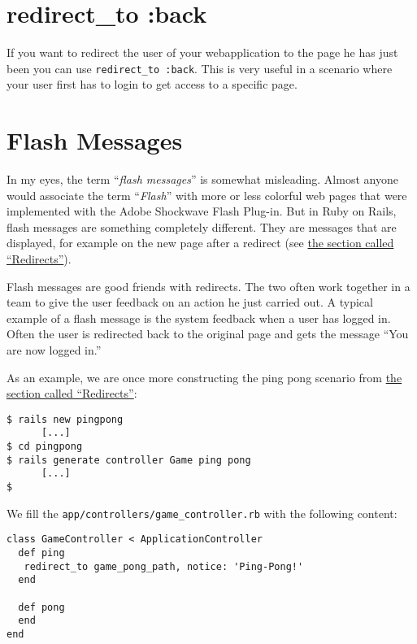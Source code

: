 \documentclass[a4paper]{book}
\begin{document}
\section{redirect\_to :back}\label{redirectux5fto-back}

If you want to redirect the user of your webapplication to the page he has just been you can use \texttt{redirect\_to :back}. This is very useful in a scenario where your user first has to login to get access to a specific page.

\section{Flash Messages}\label{flash-messages}

In my eyes, the term “\emph{flash messages}” is somewhat misleading. Almost anyone would associate the term “\emph{Flash}” with more or less colorful web pages that were implemented with the Adobe Shockwave Flash Plug-in. But in Ruby on Rails, flash messages are something completely different. They are messages that are displayed, for example on the new page after a redirect (see \hyperref[redirects]{the section called “Redirects”}).

Flash messages are good friends with redirects. The two often work together in a team to give the user feedback on an action he just carried out. A typical example of a flash message is the system feedback when a user has logged in. Often the user is redirected back to the original page and gets the message “You are now logged in.”

As an example, we are once more constructing the ping pong scenario from \hyperref[redirects]{the section called “Redirects”}:

\begin{shaded}\begin{verbatim}
$ rails new pingpong
      [...]
$ cd pingpong
$ rails generate controller Game ping pong
      [...]
$
\end{verbatim}\end{shaded}

We fill the \texttt{app/controllers/game\_controller.rb} with the following content:

\begin{shaded}\begin{verbatim}
class GameController < ApplicationController
  def ping
   redirect_to game_pong_path, notice: 'Ping-Pong!'
  end

  def pong
  end
end
\end{verbatim}\end{shaded}
\end{document}

